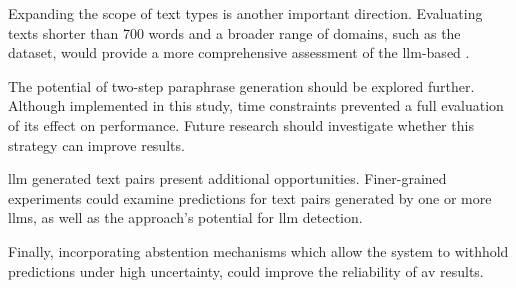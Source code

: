 Expanding the scope of text types is another important direction. 
Evaluating texts shorter than 700 words and a broader range of domains, such as the \dataPan{} dataset, would provide a more comprehensive assessment of the \ac{llm}-based \impAppr{}.  

The potential of two-step paraphrase generation should be explored further. 
Although implemented in this study, time constraints prevented a full evaluation of its effect on \impAppr{} performance. 
Future research should investigate whether this strategy can improve results.  

\ac{llm} generated text pairs present additional opportunities. Finer-grained experiments could examine predictions for text pairs generated by one or more \acp{llm}, as well as the approach's potential for \ac{llm} detection.  

Finally, incorporating abstention mechanisms which allow the system to withhold predictions under high uncertainty, could improve the reliability of \ac{av} results.
